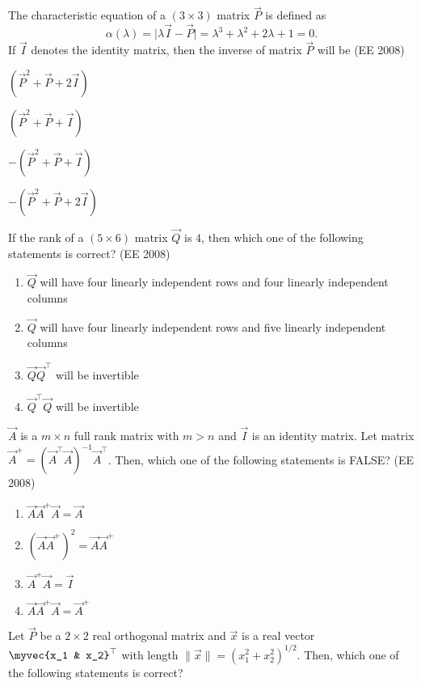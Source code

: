 \item The characteristic equation of a $(3 \times 3)$ matrix $\vec{P}$ is defined as
$$
\alpha(\lambda) = \lvert \lambda \vec{I} - \vec{P} \rvert 
= \lambda^3 + \lambda^2 + 2\lambda + 1 = 0.
$$ %
If $\vec{I}$ denotes the identity matrix, then the inverse of matrix $\vec{P}$ will be
\hfill (EE 2008)
\begin{enumerate}
\begin{multicols}{4}
    \item $(\vec{P}^2 + \vec{P} + 2\vec{I})$
    \item $(\vec{P}^2 + \vec{P} + \vec{I})$
    \item $-(\vec{P}^2 + \vec{P} + \vec{I})$
    \item $-(\vec{P}^2 + \vec{P} + 2\vec{I})$
\end{multicols}
\end{enumerate}
\item If the rank of a $(5 \times 6)$ matrix $\vec{Q}$ is $4$, then which one of the following statements is correct?
\hfill (EE 2008)
\begin{enumerate}
    \item $\vec{Q}$ will have four linearly independent rows and four linearly independent columns
    \item $\vec{Q}$ will have four linearly independent rows and five linearly independent columns
    \item $\vec{Q} \vec{Q}^{\top}$ will be invertible
    \item $\vec{Q}^{\top} \vec{Q}$ will be invertible
\end{enumerate}
\item $\vec{A}$ is a $m \times n$ full rank matrix with $m>n$ and $\vec{I}$ is an identity matrix. Let matrix $\vec{A}^{+}=(\vec{A}^{\top}\vec{A})^{-1}\vec{A}^{\top}$. Then, which one of the following statements is {FALSE}?
\hfill (EE 2008)
\begin{multicols}{4}
\begin{enumerate}
    \item $\vec{A}\vec{A}^{+}\vec{A} = \vec{A}$
    \item $(\vec{A}\vec{A}^{+})^2 = \vec{A}\vec{A}^{+}$
    \item $\vec{A}^{+}\vec{A} = \vec{I}$
    \item $\vec{A} \vec{A}^{+}\vec{A} = \vec{A}^{+}$
\end{enumerate}
\end{multicols}
%
\item Let $\vec{P}$ be a $2\times 2$ real orthogonal matrix and $\vec{x}$ is a real vector $\myvec{x_1 & x_2}^{\top}$ with length $\|\vec{x}\| = (x_1^2+x_2^2)^{1/2}$. Then, which one of the following statements is correct?
